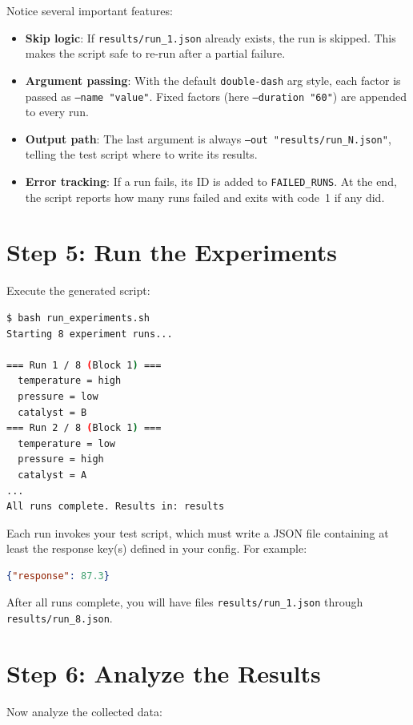 \documentclass[11pt]{book}
\begin{document}
Notice several important features:
\begin{itemize}
  \item \textbf{Skip logic}: If \texttt{results/run\_1.json} already exists, the run is skipped. This makes the script safe to re-run after a partial failure.
  \item \textbf{Argument passing}: With the default \texttt{double-dash} arg style, each factor is passed as \texttt{--name "value"}. Fixed factors (here \texttt{--duration "60"}) are appended to every run.
  \item \textbf{Output path}: The last argument is always \texttt{--out "results/run\_N.json"}, telling the test script where to write its results.
  \item \textbf{Error tracking}: If a run fails, its ID is added to \texttt{FAILED\_RUNS}. At the end, the script reports how many runs failed and exits with code~1 if any did.
\end{itemize}

\section{Step 5: Run the Experiments}

Execute the generated script:

\begin{lstlisting}[language=bash]
$ bash run_experiments.sh
Starting 8 experiment runs...

=== Run 1 / 8 (Block 1) ===
  temperature = high
  pressure = low
  catalyst = B
=== Run 2 / 8 (Block 1) ===
  temperature = low
  pressure = high
  catalyst = A
...
All runs complete. Results in: results
\end{lstlisting}

Each run invokes your test script, which must write a JSON file containing at least the response key(s) defined in your config. For example:

\begin{lstlisting}[language=json]
{"response": 87.3}
\end{lstlisting}

After all runs complete, you will have files \texttt{results/run\_1.json} through \texttt{results/run\_8.json}.

\section{Step 6: Analyze the Results}

Now analyze the collected data:
\end{document}
